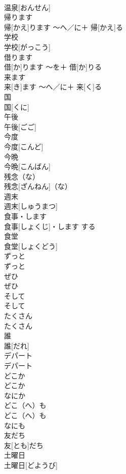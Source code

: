 \documentclass[8pt]{extreport}
\begin{document}
\begin{CJK}{UTF8}{min}
\\	温泉[おんせん]		
\\	帰ります	
\\	帰[かえ]ります	〜へ／に＋ 帰[かえ]る	
\\	学校	
\\	学校[がっこう]		
\\	借ります	
\\	借[か]ります	〜を＋ 借[か]りる	
\\	来ます	
\\	来[き]ます	〜へ／に＋ 来[く]る	
\\	国	
\\	国[くに]		
\\	午後	
\\	午後[ごご]		
\\	今度	
\\	今度[こんど]		
\\	今晩	
\\	今晩[こんばん]		
\\	残念（な）	
\\	残念[ざんねん]（な）		
\\	週末	
\\	週末[しゅうまつ]		
\\	食事・します	
\\	食事[しょくじ]・します	する	
\\	食堂	
\\	食堂[しょくどう]		
\\	ずっと	
\\	ずっと		
\\	ぜひ	
\\	ぜひ		
\\	そして	
\\	そして		
\\	たくさん	
\\	たくさん		
\\	誰	
\\	誰[だれ]		
\\	デパート	
\\	デパート		
\\	どこか	
\\	どこか	
\\	なにか 
\\	どこ（へ）も	
\\	どこ（へ）も	
\\	なにも 
\\	友だち	
\\	友[とも]だち		
\\	土曜日	
\\	土曜日[どようび]		

\end{CJK}
\end{document}
